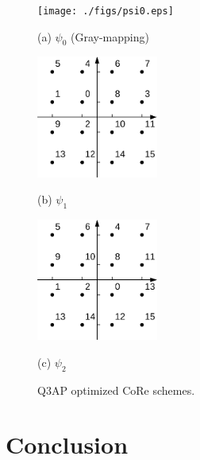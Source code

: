 \documentclass[conference]{IEEEtran}
\begin{document}
\begin{figure}[!t]
    \begin{minipage}[b]{1\linewidth}
      \centering
      \centerline{\texttt{[image: ./figs/psi0.eps]}}
      \centerline{(a) $\psi_0$ (Gray-mapping)}\medskip
    \end{minipage}
    \begin{minipage}[b]{0.48\linewidth}
      \centering
      \centerline{\includegraphics[width=4.0cm]{./figs/psi1.eps}}
      \centerline{(b) $\psi_1$}\medskip
    \end{minipage}
    \hfill
    \begin{minipage}[b]{.48\linewidth}
      \centering
      \centerline{\includegraphics[width=4.0cm]{./figs/psi2.eps}}
      \centerline{(c) $\psi_2$}\medskip
    \end{minipage}
    \caption{Q3AP optimized CoRe schemes.}
    \label{fig:example}
\end{figure}






\section{Conclusion}
\label{sec:conclusion}




\end{document}
